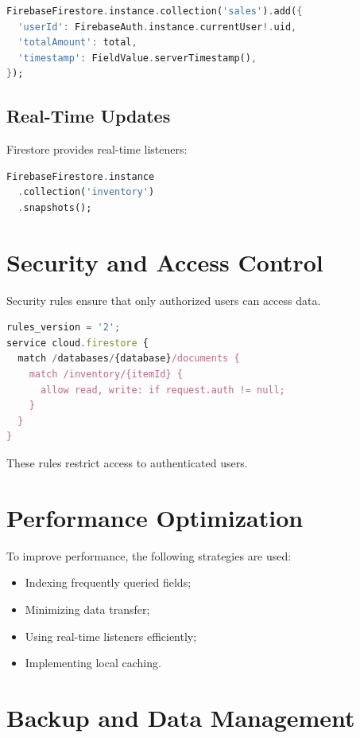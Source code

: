 \begin{lstlisting}[language=Dart]
FirebaseFirestore.instance.collection('sales').add({
  'userId': FirebaseAuth.instance.currentUser!.uid,
  'totalAmount': total,
  'timestamp': FieldValue.serverTimestamp(),
});
\end{lstlisting}

\subsection{Real-Time Updates}

Firestore provides real-time listeners:

\begin{lstlisting}[language=Dart]
FirebaseFirestore.instance
  .collection('inventory')
  .snapshots();
\end{lstlisting}

\section{Security and Access Control}

Security rules ensure that only authorized users can access data.

\begin{lstlisting}[language=JavaScript]
rules_version = '2';
service cloud.firestore {
  match /databases/{database}/documents {
    match /inventory/{itemId} {
      allow read, write: if request.auth != null;
    }
  }
}
\end{lstlisting}

These rules restrict access to authenticated users.

\section{Performance Optimization}

To improve performance, the following strategies are used:

\begin{itemize}
    \item Indexing frequently queried fields;
    \item Minimizing data transfer;
    \item Using real-time listeners efficiently;
    \item Implementing local caching.
\end{itemize}

\section{Backup and Data Management}

